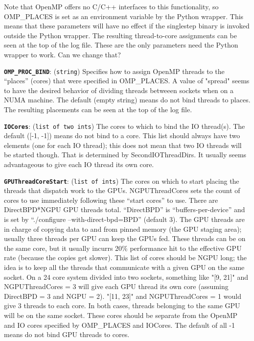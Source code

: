 \documentclass[11pt,preprint]{aastex}
\newcommand{\param}[2]{\medskip\noindent\textbf{\texttt{#1}}: ({\tt #2}) }
\newcommand{\todo}{}
\newcommand{\todo}[1]{{\bf TODO: #1}}
\begin{document}
Note that OpenMP offers no C/C++ interfaces to this
functionality, so OMP\_PLACES is set as an environment variable by
the Python wrapper.  This means that these parameters will have no
effect if the singlestep binary is invoked outside the Python wrapper.
The resulting thread-to-core assignments can be seen at the top of the log
file.
\todo{These are the only parameters need the Python wrapper to work.
Can we change that?}

\param{OMP\_PROC\_BIND}{string} Specifies how to assign OpenMP
threads to the ``places'' (cores) that were specified in OMP\_PLACES.
A value of "spread" seems to have the desired behavior of dividing
threads betweeen sockets when on a NUMA machine.  The default (empty
string) means do not bind threads to places.  The resulting placements
can be seen at the top of the log file.

\param{IOCores}{list of two ints} The cores to which to bind the IO thread(s).
The default ([-1, -1]) means do not bind to a core.  This list should always
have two elements (one for each IO thread); this does not mean that two
IO threads will be started though.  That is determined by SecondIOThreadDirs.
It usually seems advantageous to give each IO thread its own core.

\param{GPUThreadCoreStart}{list of ints} The cores on which to start placing
the threads that dispatch work to the GPUs.  NGPUThreadCores sets the count of cores
to use immediately following these ``start cores'' to use.  There are DirectBPD*NGPU GPU threads
total.  ``DirectBPD'' is ``buffers-per-device'' and is set by ``./configure --with-direct-bpd=BPD'' (default 3).
The GPU threads are in charge of copying data to and from pinned memory (the GPU staging area);
usually three threads per GPU can keep the GPUs fed.  These threads can be on the same core,
but it usually incurrs 20\% performance hit to the effective GPU rate (because the copies get slower).
This list of cores should be NGPU long; the idea is to keep all the threads that
communicate with a given GPU on the same socket.  On a 24 core system divided into two sockets,
something like "[9, 21]" and NGPUThreadCores = 3 will give each GPU thread its own core (assuming DirectBPD = 3
and NGPU = 2).  "[11, 23]" and NGPUThreadCores = 1 would give 3 threads to each core.  In both
cases, threads belonging to the same GPU will be on the same socket.  These
cores should be separate from the OpenMP and IO cores specified by OMP\_PLACES
and IOCores.  The default of all -1 means do not bind GPU threads to cores.
\end{document}
